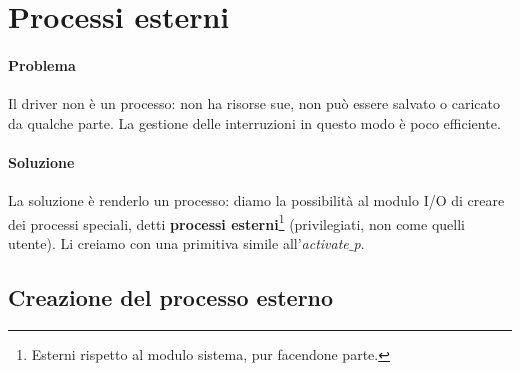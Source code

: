 \section{Processi esterni}
\paragraph{Problema} Il driver non è un processo: non ha risorse sue, non può essere salvato o caricato da qualche parte. La gestione delle interruzioni in questo modo è poco efficiente.
\paragraph{Soluzione} {La soluzione è renderlo un processo}: diamo la possibilità al modulo I/O di creare dei processi speciali, detti \textbf{processi esterni}\footnote{Esterni rispetto al modulo sistema, pur facendone parte.} (privilegiati, non come quelli utente). Li creiamo con una primitiva simile all'\emph{activate$\_$p}.


\subsection{Creazione del processo esterno}


